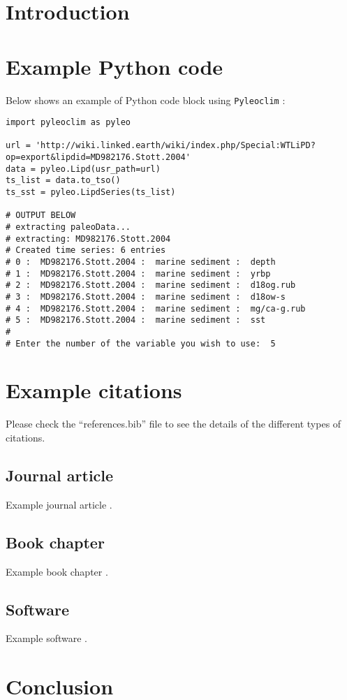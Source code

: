 \section{Introduction}
\blindtext

\section{Example Python code}
Below shows an example of Python code block using \texttt{Pyleoclim} \citep{pyleoclim}:
\begin{lstlisting}
import pyleoclim as pyleo

url = 'http://wiki.linked.earth/wiki/index.php/Special:WTLiPD?op=export&lipdid=MD982176.Stott.2004'
data = pyleo.Lipd(usr_path=url)
ts_list = data.to_tso()
ts_sst = pyleo.LipdSeries(ts_list)

# OUTPUT BELOW
# extracting paleoData...
# extracting: MD982176.Stott.2004
# Created time series: 6 entries
# 0 :  MD982176.Stott.2004 :  marine sediment :  depth
# 1 :  MD982176.Stott.2004 :  marine sediment :  yrbp
# 2 :  MD982176.Stott.2004 :  marine sediment :  d18og.rub
# 3 :  MD982176.Stott.2004 :  marine sediment :  d18ow-s
# 4 :  MD982176.Stott.2004 :  marine sediment :  mg/ca-g.rub
# 5 :  MD982176.Stott.2004 :  marine sediment :  sst
# 
# Enter the number of the variable you wish to use:  5
\end{lstlisting}

\section{Example citations}
Please check the ``references.bib'' file to see the details of the different types of citations.

\subsection{Journal article}
Example journal article \citet{zhu_resolving_2020}.

\subsection{Book chapter}
Example book chapter \citet{ENSObook2020:ch05}.

\subsection{Software}
Example software \citet{feng_zhu_2019_3590258}.

\section{Conclusion}
\blindtext